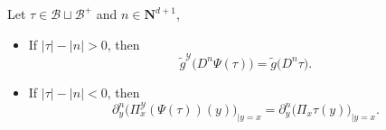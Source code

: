 \documentclass[11pt]{preprint}
\newcommand{\mcB}{\mathcal{B}}
\newcommand{\mcY}{\mathcal{Y}}
\newcommand{\bfN}{\mathbf{N}}
\begin{document}
	
	
	
	
	
	
	\begin{proposition}\label{prop_starderivY}
		Let $\tau\in \mcB\sqcup\mcB^+$ and $n\in\bfN^{d+1}$,
		\begin{itemize}
			\item[-] If $|\tau|-|n|>0$, then 
			\begin{equation}
				\widetilde{ g}^\mcY\big( D^n \Psi(\tau) \big)
				= \widetilde{ g}\big( D^n \tau \big).
			\end{equation}
			\item[-] If $|\tau|-|n|<0$, then 
			\begin{equation}
				\partial^n_{y} \Big({\Pi}^\mcY_x\left(\Psi(\tau)\right)(y)\Big)_{|y=x}=
				\partial^n_y \big({ \Pi}_x \tau (y) \big)_{|y=x}.
			\end{equation}
		\end{itemize}
	\end{proposition}
\end{document}
